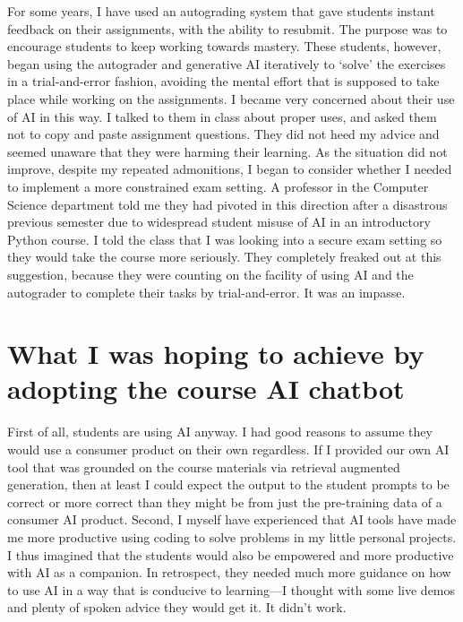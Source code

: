 \documentclass{tufte-handout}
\begin{document}
For some years, I have used an autograding system that gave students instant feedback on their assignments, with the ability to resubmit. The purpose was to encourage students to keep working towards mastery. These students, however, began using the autograder and generative AI iteratively to `solve' the exercises in a trial-and-error fashion, avoiding the mental effort that is supposed to take place while working on the assignments. I became very concerned about their use of AI in this way. I talked to them in class about proper uses, and asked them not to copy and paste assignment questions. They did not heed my advice and seemed unaware that they were harming their learning. As the situation did not improve, despite my repeated admonitions, I began to consider whether I needed to implement a more constrained exam setting. A professor in the Computer Science department told me they had pivoted in this direction after a disastrous previous semester due to widespread student misuse of AI in an introductory Python course. I told the class that I was looking into a secure exam setting so they would take the course more seriously. They completely freaked out at this suggestion, because they were counting on the facility of using AI and the autograder to complete their tasks by trial-and-error. It was an impasse.

\section{What I was hoping to achieve by adopting the course AI chatbot}

First of all, students are using AI anyway. I had good reasons to assume they would use a consumer product on their own regardless. If I provided our own AI tool that was grounded on the course materials via retrieval augmented generation, then at least I could expect the output to the student prompts to be correct or more correct than they might be from just the pre-training data of a consumer AI product. Second, I myself have experienced that AI tools have made me more productive using coding to solve problems in my little personal projects. I thus imagined that the students would also be empowered and more productive with AI as a companion. In retrospect,  they needed much more guidance on how to use AI in a way that is conducive to learning---I thought with some live demos and plenty of spoken advice they would get it. It didn’t work.
\end{document}
